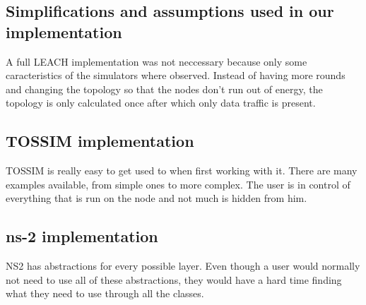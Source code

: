  

\subsection{Simplifications and assumptions used in our implementation}
A full LEACH implementation was not neccessary because only some caracteristics of
the simulators where observed. Instead of having more rounds and changing the topology
so that the nodes don't run out of energy, the topology is only calculated once after
which only data traffic is present.
\subsection{TOSSIM implementation}
TOSSIM is really easy to get used to when first working with it. There are many examples
available, from simple ones to more complex. The user is in control of everything that is
run on the node and not much is hidden from him.

\subsection{ns-2 implementation}
NS2 has abstractions for every possible layer. Even though a user would normally not need to use
all of these abstractions, they would have a hard time finding what they need to use through all 
the classes.

